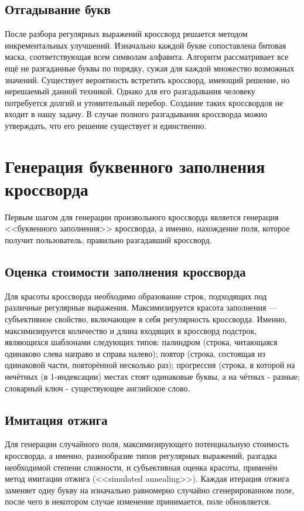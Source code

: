 \documentclass[12pt]{report}
\begin{document}
\subsection{Отгадывание букв} После разбора регулярных выражений кроссворд решается методом инкрементальных улучшений. Изначально каждой букве сопоставлена битовая маска, соответствующая всем символам алфавита. Алгоритм рассматривает все ещё не разгаданные буквы по порядку, сужая для каждой множество возможных значений. Существует вероятность встретить кроссворд, имеющий решение, но нерешаемый данной техникой. Однако для его разгадывания человеку потребуется долгий и утомительный перебор. Создание таких кроссвордов не входит в нашу задачу. В случае полного разгадывания кроссворда можно утверждать, что его решение существует и единственно.


\section{Генерация буквенного заполнения кроссворда} 
Первым шагом для генерации произвольного кроссворда является генерация <<буквенного заполнения>> кроссворда, а именно, нахождение поля, которое получит пользователь, правильно разгадавший кроссворд.

\subsection{Оценка стоимости заполнения кроссворда}
Для красоты кроссворда необходимо образование строк, подходящих под различные регулярные выражения. Максимизируется красота заполнения — субъективное свойство, включающее в себя регулярность кроссворда. Именно, максимизируется количество и длина входящих в кроссворд подстрок, являющихся шаблонами следующих типов: палиндром (строка, читающаяся одинаково слева направо и справа налево); повтор (строка, состоящая из одинаковой части, повторённой несколько раз); прогрессия (строка, в которой на нечётных (в 1-индексации) местах стоят одинаковые буквы, а на чётных - разные; словарный ключ - существующее английское слово.

\subsection{Имитация отжига} Для генерации случайного поля, максимизирующего потенциальную стоимость кроссворда, а именно, разнообразие типов регулярных выражений, разгадка необходимой степени сложности, и субъективная оценка красоты, применён метод имитации отжига (<<simulated annealing>>). Каждая итерация отжига заменяет одну букву на изначально равномерно случайно сгенерированном поле, после чего в некотором случае изменение принимается, поле обновляется.
\end{document}
